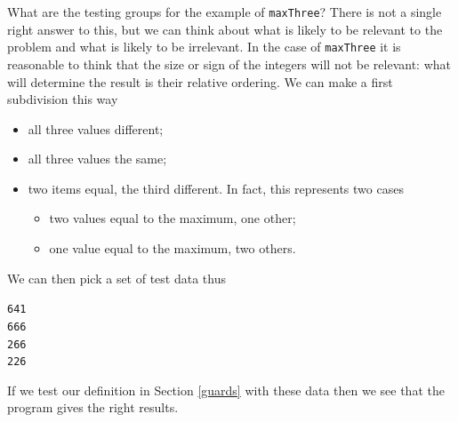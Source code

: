 What are the testing groups for the example of \texttt{maxThree}? There
is not a single right answer to this, but we can think about what is likely
to be relevant to the problem  and what is likely to be irrelevant. In
the case of \texttt{maxThree} it is reasonable to think that the size or
sign of the integers will not be relevant: what will determine the
result is their relative ordering. We can make a first subdivision this
way
\begin{itemize}
\item all three values different;
\item all three values the same;
\item two items equal, the third different. In fact, this represents two
cases
\begin{itemize}
\item two values equal to the maximum, one other;
\item one value equal to the maximum, two others.
\end{itemize}
\end{itemize}
We can then pick a set of test data thus
\begin{alltt}
6 4 1
6 6 6
2 6 6
2 2 6
\end{alltt}
If we test our definition in Section \ref{guards} with these data then
we see that the program gives the right results. 

